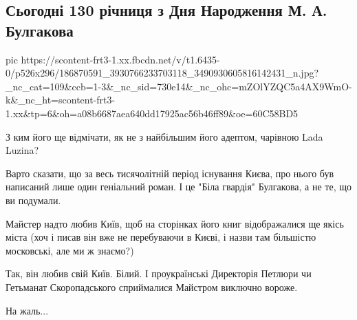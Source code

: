  
 
 
 
 

\subsection{Сьогодні 130 річниця з Дня Народження М. А. Булгакова}
\label{sec:15_05_2021.fb.bilonyk_andrej.1.bulgakov_130}

\ifcmt
  pic https://scontent-frt3-1.xx.fbcdn.net/v/t1.6435-0/p526x296/186870591_3930766233703118_3490930605816142431_n.jpg?_nc_cat=109&ccb=1-3&_nc_sid=730e14&_nc_ohc=mZOlYZQC5a4AX9WmO-k&_nc_ht=scontent-frt3-1.xx&tp=6&oh=a08b6687aea640dd17925ac56b46ff89&oe=60C58BD5
\fi

З ким його ще відмічати, як не з найбільшим його адептом, чарівною Lada Luzina?

Варто сказати, що за весь тисячолітній період існування Києва, про нього був
написаний лише один геніальний роман. І це  "Біла гвардія" Булгакова, а не те,
що ви подумали.

Майстер надто любив Київ, щоб на сторінках його книг відображалися ще якісь
міста (хоч і писав він вже не перебуваючи в Києві, і назви там більшістю
московські, але ми ж знаємо?)

Так, він любив свій Київ. Білий. І проукраїнські Директорія Петлюри чи
Гетьманат Скоропадського сприймалися Майстром виключно вороже.

На жаль...
